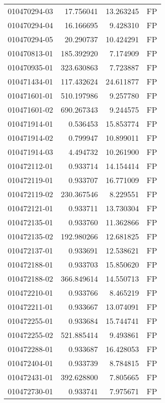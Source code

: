 \begin{tabular}{lrrl}
010470294-03 &   17.756041 &      13.263245 &   FP \\
010470294-04 &   16.166695 &       9.428310 &   FP \\
010470294-05 &   20.290737 &      10.424291 &   FP \\
010470813-01 &  185.392920 &       7.174909 &   FP \\
010470935-01 &  323.630863 &       7.723887 &   FP \\
010471434-01 &  117.432624 &      24.611877 &   FP \\
010471601-01 &  510.197986 &       9.257780 &   FP \\
010471601-02 &  690.267343 &       9.244575 &   FP \\
010471914-01 &    0.536453 &      15.853774 &   FP \\
010471914-02 &    0.799947 &      10.899011 &   FP \\
010471914-03 &    4.494732 &      10.261900 &   FP \\
010472112-01 &    0.933714 &      14.154414 &   FP \\
010472119-01 &    0.933707 &      16.771009 &   FP \\
010472119-02 &  230.367546 &       8.229551 &   FP \\
010472121-01 &    0.933711 &      13.730304 &   FP \\
010472135-01 &    0.933760 &      11.362866 &   FP \\
010472135-02 &  192.980266 &      12.681825 &   FP \\
010472137-01 &    0.933691 &      12.538621 &   FP \\
010472188-01 &    0.933703 &      15.850620 &   FP \\
010472188-02 &  366.849614 &      14.550713 &   FP \\
010472210-01 &    0.933766 &       8.465219 &   FP \\
010472211-01 &    0.933667 &      13.074091 &   FP \\
010472255-01 &    0.933684 &      15.744741 &   FP \\
010472255-02 &  521.885414 &       9.493861 &   FP \\
010472288-01 &    0.933687 &      16.428053 &   FP \\
010472404-01 &    0.933739 &       8.784815 &   FP \\
010472431-01 &  392.628800 &       7.805665 &   FP \\
010472730-01 &    0.933741 &       7.975671 &   FP \\

\end{tabular}
